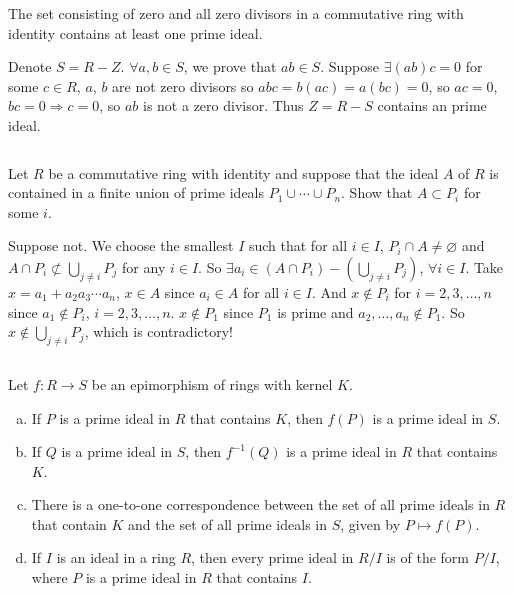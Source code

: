 $$ $$

\begin{ex}
    The set consisting of zero and all zero divisors in a commutative ring with identity contains at least one prime ideal.
\end{ex}

\begin{answer}
    Denote $S=R-Z$. $\forall a,b\in S$, we prove that $ab\in S$. Suppose $\exists (ab)c=0$ for some $c\in R$, $a$, $b$ are not zero divisors so $abc=b(ac)=a(bc)=0$, so $ac=0$, $bc=0\Rightarrow c=0$, so $ab$ is not a zero divisor. Thus $Z=R-S$ contains an prime ideal.
\end{answer}

$$ $$

\begin{ex}
    Let $R$ be a commutative ring with identity and suppose that the ideal $A$ of $R$ is contained in a finite union of prime ideals $P_{1}\cup\cdots\cup P_{n}$. Show that $A\subset P_{i}$ for some $i$.
\end{ex}

\begin{answer}
    Suppose not. We choose the smallest $I$ such that for all $i\in I$, $P_{i}\cap A\neq \varnothing$ and $A\cap P_{i}\not\subset\bigcup\limits_{j\neq i}P_{j}$ for any $i\in I$. So $\exists a_{i}\in (A\cap P_{i})-(\bigcup\limits_{j\neq i}P_{j})$, $\forall i\in I$. Take $x=a_{1}+a_{2}a_{3}\cdots a_{n}$, $x\in A$ since $a_{i}\in A$ for all $i\in I$. And $x\notin P_{i}$ for $i=2,3,\dots, n$ since $a_{1}\notin P_{i}$, $i=2,3,\dots, n$. $x\notin P_{1}$ since $P_{1}$ is prime and $a_{2}, \dots, a_{n}\notin P_{1}$. So $x\notin \bigcup\limits_{j\neq i}P_{j}$, which is contradictory!
\end{answer}

$$ $$

\begin{ex}
    Let $f:R\to S$ be an epimorphism of rings with kernel $K$.
    \begin{enumerate}[(a)]
        \item If $P$ is a prime ideal in $R$ that contains $K$, then $f(P)$ is a prime ideal in $S$.
        \item If $Q$ is a prime ideal in $S$, then $f^{-1}(Q)$ is a prime ideal in $R$ that contains $K$.
        \item There is a one-to-one correspondence between the set of all prime ideals in $R$ that contain $K$ and the set of all prime ideals in $S$, given by $P\mapsto f(P)$.
        \item If $I$ is an ideal in a ring $R$, then every prime ideal in $R /I$ is of the form $P /I$, where $P$ is a prime ideal in $R$ that contains $I$.
    \end{enumerate}
\end{ex}

